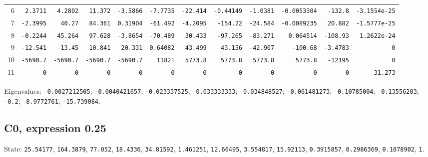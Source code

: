 \begin{landscape}
\begin{tabular}{rrrrrrrrrrrr}
6 & \texttt{2.3711} & \texttt{4.2802} & \texttt{11.372} & \texttt{-3.5866} & \texttt{-7.7735} & \texttt{-22.414} & \texttt{-0.44149} & \texttt{-1.0381} & \texttt{-0.0053304} & \texttt{-132.8} & \texttt{-3.1554e-25} \\

7 & \texttt{-2.3995} & \texttt{40.27} & \texttt{84.361} & \texttt{0.31904} & \texttt{-61.492} & \texttt{-4.2095} & \texttt{-154.22} & \texttt{-24.584} & \texttt{-0.0089235} & \texttt{20.882} & \texttt{-1.5777e-25} \\

8 & \texttt{-0.2244} & \texttt{45.264} & \texttt{97.628} & \texttt{-3.8654} & \texttt{-70.489} & \texttt{30.433} & \texttt{-97.265} & \texttt{-83.271} & \texttt{0.064514} & \texttt{-108.93} & \texttt{1.2622e-24} \\

9 & \texttt{-12.541} & \texttt{-13.45} & \texttt{10.841} & \texttt{20.331} & \texttt{0.64082} & \texttt{43.499} & \texttt{43.156} & \texttt{-42.907} & \texttt{-100.68} & \texttt{-3.4783} & \texttt{0} \\

10 & \texttt{-5690.7} & \texttt{-5690.7} & \texttt{-5690.7} & \texttt{-5690.7} & \texttt{11821} & \texttt{5773.8} & \texttt{5773.8} & \texttt{5773.8} & \texttt{5773.8} & \texttt{-12195} & \texttt{0} \\

11 & \texttt{0} & \texttt{0} & \texttt{0} & \texttt{0} & \texttt{0} & \texttt{0} & \texttt{0} & \texttt{0} & \texttt{0} & \texttt{0} & \texttt{-31.273} \\

\bottomrule\end{tabular}\par\endgroup

{\scriptsize Eigenvalues: \texttt{-0.0027212505}; \texttt{-0.0040421657}; \texttt{-0.023337525}; \texttt{-0.033333333}; \texttt{-0.034848527}; \texttt{-0.061481273}; \texttt{-0.10785004}; \texttt{-0.13556203}; \texttt{-0.2}; \texttt{-8.9772761}; \texttt{-15.739084}.\par}

\clearpage
\subsection*{C0, expression 0.25}
{\scriptsize State: \texttt{25.54177}, \texttt{164.3879}, \texttt{77.052}, \texttt{18.4336}, \texttt{34.81592}, \texttt{1.461251}, \texttt{12.66495}, \texttt{3.554817}, \texttt{15.92113}, \texttt{0.3915857}, \texttt{0.2986369}, \texttt{0.1078902}, \texttt{1}.\par

}
\end{landscape}

